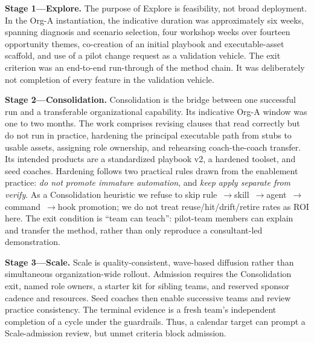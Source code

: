\documentclass[10pt,conference]{IEEEtran}
\begin{document}
\textbf{Stage 1---Explore.}
The purpose of Explore is feasibility, not broad deployment.  In the Org-A
instantiation, the indicative duration was approximately six weeks, spanning
diagnosis and scenario selection, four workshop weeks over fourteen opportunity
themes, co-creation of an initial playbook and executable-asset scaffold, and
use of a pilot change request as a validation vehicle.  The exit criterion
was an end-to-end run-through of the method chain.  It was deliberately not
completion of every feature in the validation vehicle.

\textbf{Stage 2---Consolidation.}
Consolidation is the bridge between one successful run and a transferable
organizational capability.  Its indicative Org-A window was one to two
months.  The work comprises revising clauses that read correctly but do not
run in practice, hardening the principal executable path from stubs to usable
assets, assigning role ownership, and rehearsing coach-the-coach transfer.
Its intended products are a standardized playbook v2, a hardened toolset, and
seed coaches.
Hardening follows two practical rules drawn from the enablement practice:
\emph{do not promote immature automation}, and \emph{keep apply separate
from verify}.
As a Consolidation heuristic we refuse to skip
rule~$\rightarrow$skill~$\rightarrow$agent~$\rightarrow$command~$\rightarrow$hook
promotion; we do not treat reuse/hit/drift/retire rates as ROI here.
The exit condition is ``team can teach'': pilot-team members can explain and
transfer the method, rather than only reproduce a consultant-led
demonstration.

\textbf{Stage 3---Scale.}
Scale is quality-consistent, wave-based diffusion rather than simultaneous
organization-wide rollout.  Admission requires the Consolidation exit,
named role owners, a starter kit for sibling teams, and reserved sponsor
cadence and resources.  Seed coaches then enable successive teams and review
practice consistency.  The terminal evidence is a fresh team's independent
completion of a cycle under the guardrails.  Thus, a calendar target can
prompt a Scale-admission review, but unmet criteria block admission.
\end{document}
